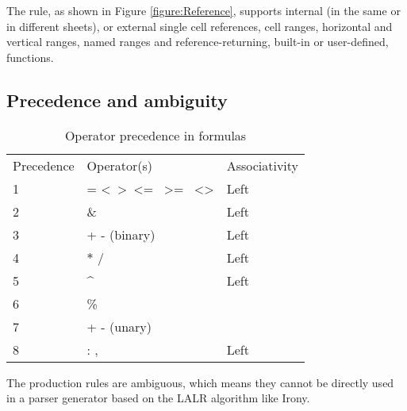 The  rule, as shown in Figure \ref{figure:Reference}, supports internal (in the same or in different sheets), or external single cell references, cell ranges, horizontal and vertical ranges, named ranges and reference-returning, built-in or user-defined, functions.


%	
%
%	

\subsection{Precedence and ambiguity}

\begin{table}
\small
\begin{tabular}{lll}
Precedence & Operator(s) & Associativity \\
1 & = \textless \  \textgreater \  \textless= \  \textgreater= \  \textless\textgreater & Left         \\
2 & \& & Left \\
3 & + - (binary) & Left \\
4 & $\ast$ / & Left \\
5 & \textasciicircum & Left\footnotemark \\
6 & \% & \\
7 & + - (unary) & \\
8 & : , \texttt{\char32} & Left
\end{tabular}
\caption{Operator precedence in formulas}
\label{table:operatorprec}
\end{table}


The production rules are ambiguous, which means they cannot be directly used in a parser generator based on the LALR algorithm like Irony.

